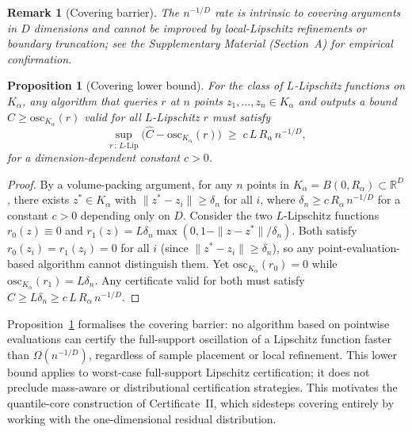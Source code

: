\documentclass[12pt]{article}
\newtheorem{proposition}[theorem]{Proposition}
\newtheorem{remark}[theorem]{Remark}
\newcommand{\osc}{\mathrm{osc}}
\begin{document}
\begin{remark}[Covering barrier]
The $n^{-1/D}$ rate is intrinsic to covering arguments in $D$ dimensions and cannot be improved by local-Lipschitz refinements or boundary truncation; see the Supplementary Material (Section~A) for empirical confirmation.
\end{remark}

\begin{proposition}[Covering lower bound]\label{prop:lower}
For the class of $L$-Lipschitz functions on $K_\alpha$, any algorithm that queries $r$ at $n$ points $z_1,\ldots,z_n \in K_\alpha$ and outputs a bound $\hat{C} \ge \osc_{K_\alpha}(r)$ valid for all $L$-Lipschitz $r$ must satisfy
\[
  \sup_{r \,:\, L\text{-Lip}} \bigl(\hat{C} - \osc_{K_\alpha}(r)\bigr) \;\ge\; c \, L \, R_\alpha \, n^{-1/D},
\]
for a dimension-dependent constant $c > 0$.
\end{proposition}

\begin{proof}
By a volume-packing argument, for any $n$ points in $K_\alpha = B(0, R_\alpha) \subset \mathbb{R}^D$, there exists $z^* \in K_\alpha$ with $\|z^* - z_i\| \ge \delta_n$ for all $i$, where $\delta_n \ge c \, R_\alpha \, n^{-1/D}$ for a constant $c > 0$ depending only on $D$.
Consider the two $L$-Lipschitz functions $r_0(z) \equiv 0$ and $r_1(z) = L\delta_n \max(0, 1 - \|z - z^*\|/\delta_n)$.
Both satisfy $r_0(z_i) = r_1(z_i) = 0$ for all $i$ (since $\|z^* - z_i\| \ge \delta_n$), so any point-evaluation-based algorithm cannot distinguish them.
Yet $\osc_{K_\alpha}(r_0) = 0$ while $\osc_{K_\alpha}(r_1) = L\delta_n$.
Any certificate valid for both must satisfy $\hat{C} \ge L\delta_n \ge c \, L \, R_\alpha \, n^{-1/D}$.
\end{proof}

Proposition~\ref{prop:lower} formalises the covering barrier: no algorithm based on pointwise evaluations can certify the full-support oscillation of a Lipschitz function faster than $\Omega(n^{-1/D})$, regardless of sample placement or local refinement. This lower bound applies to worst-case full-support Lipschitz certification; it does not preclude mass-aware or distributional certification strategies. This motivates the quantile-core construction of Certificate~II, which sidesteps covering entirely by working with the one-dimensional residual distribution.


\end{document}
